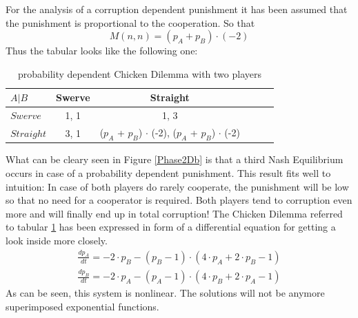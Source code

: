 \documentclass[11pt]{article}
\begin{document}
For the analysis of a corruption dependent punishment it has been assumed that the punishment is proportional to the cooperation. So that 
\begin{equation}
M(n,n) = (p_A + p_B) \cdot (-2)
\end{equation}
Thus the tabular looks like the following one:
\begin{table}[htbp]
\centering
\begin{tabular}{|l|c|c|l|c|c|}

\hline
$ A | B $     &     Swerve  &    Straight    \\                           
\hline
$ Swerve $      &  1,  1     &  1,  3  \\
\hline
$ Straight $      &  3,  1    &  ($p_A$ + $p_B$) $\cdot$ (-2),  ($p_A$ + $p_B$) $\cdot$ (-2)      \\
\hline
\end{tabular}

\label{probdependent} 
\caption{probability dependent Chicken Dilemma with two players}

\end{table}

What can be cleary seen in Figure \ref{Phase2Db} is that a third Nash Equilibrium occurs in case of a probability dependent punishment. This result fits well to intuition: In case of both players do rarely cooperate, the punishment will be low so that no need for a cooperator is required. Both players tend to corruption even more and will finally end up in total corruption!
The Chicken Dilemma referred to tabular \ref{probdependent} has been expressed in form of a differential equation for getting a look inside more closely.
\begin{equation}
\begin{split}
\frac{d p_A}{dt} = - 2 \cdot p_B - (p_B - 1) \cdot (4 \cdot p_A + 2 \cdot p_B - 1) \\ \frac{d p_B}{dt} = - 2 \cdot p_A - (p_A - 1) \cdot (4 \cdot p_B + 2 \cdot p_A - 1)
\end{split}
\end{equation}
As can be seen, this system is nonlinear. The solutions will not be anymore superimposed exponential functions. 
\end{document}
